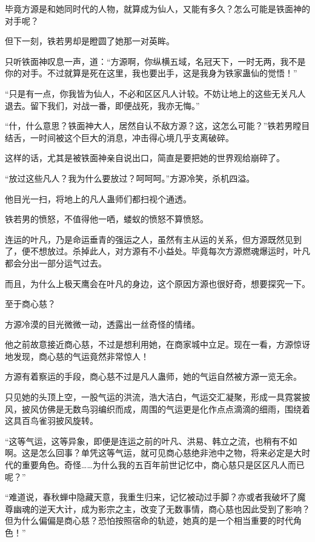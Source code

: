 \begin{this_body}
毕竟方源是和她同时代的人物，就算成为仙人，又能有多久？怎么可能是铁面神的对手呢？

但下一刻，铁若男却是瞪圆了她那一对英眸。

只听铁面神叹息一声，道：“方源啊，你纵横五域，名冠天下，一时无两，我不是你的对手。不过就算是死在这里，我也要出手，这是我身为铁家蛊仙的觉悟！”

“只是有一点，你我皆为仙人，不必和区区凡人计较。不妨让地上的这些无关凡人退去。留下我们，对战一番，即便战死，我亦无悔。”

“什，什么意思？铁面神大人，居然自认不敌方源？这，这怎么可能？”铁若男瞠目结舌，一时间被这个巨大的消息，冲击得心境几乎支离破碎。

这样的话，尤其是被铁面神亲自说出口，简直是要把她的世界观给崩碎了。

“放过这些凡人？我为什么要放过？呵呵呵。”方源冷笑，杀机四溢。

他目光一扫，将地上的凡人蛊师们都扫视个通透。

铁若男的愤怒，不值得他一哂，蝼蚁的愤怒不算愤怒。

连运的叶凡，乃是命运垂青的强运之人，虽然有主从运的关系，但方源既然见到了，便不想放过。杀掉此人，对方源有不小益处。毕竟每次方源燃魂爆运时，叶凡都会分出一部分运气过去。

而且，为什么上极天鹰会在叶凡的身边，这个原因方源也很好奇，想要探究一下。

至于商心慈？

方源冷漠的目光微微一动，透露出一丝奇怪的情绪。

他之前故意接近商心慈，不过是想利用她，在商家城中立足。现在一看，方源惊讶地发现，商心慈的气运竟然非常惊人！

方源有着察运的手段，商心慈不过是凡人蛊师，她的气运自然被方源一览无余。

只见她的头顶上空，一股气运的洪流，浩大洁白，气运交汇凝聚，形成一具霓裳披风，披风仿佛是无数鸟羽编织而成，周围的气运更是化作点点滴滴的细雨，围绕着这具百鸟雀羽披风旋转。

“这等气运，这等异象，即便是连运之前的叶凡、洪易、韩立之流，也稍有不如啊。这是怎么回事？单凭这等气运，就可见商心慈绝非池中之物，将来必定是大时代的重要角色。奇怪……为什么我的五百年前世记忆中，商心慈只是区区凡人而已呢？”

“难道说，春秋蝉中隐藏天意，我重生归来，记忆被动过手脚？亦或者我破坏了魔尊幽魂的逆天大计，成为影宗之主，改变了无数事情，商心慈也因此受到了影响？但为什么偏偏是商心慈？恐怕按照宿命的轨迹，她真的是一个相当重要的时代角色！”


\end{this_body}

